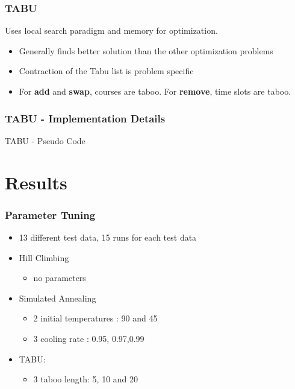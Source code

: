 \documentclass{beamer}
\makeatletter
\newenvironment{algorithm}[1][]{%
  \def\@captype{algorithm}%
  \par\nobreak\begin{center}\nobreak}
  {\par\nobreak\end{center}\nobreak}
\newcounter{algorithm}
\makeatother
\begin{document}
\begin{frame}
\frametitle{TABU}
Uses local search paradigm and memory for optimization.
\begin{itemize}
\item Generally finds better solution than the other optimization problems
\item Contraction of the Tabu list is problem specific
\item For \textbf{add} and \textbf{swap}, courses are taboo. For \textbf{remove}, time slots are taboo.
\end{itemize}
\end{frame}

\begin{frame}[shrink=20]
\frametitle{TABU  - Implementation Details}
\begin{algorithm}[H]
\begin{algorithmic}[1]
\REPEAT
{}
\ENDIF
{}
\ENDIF
{}
\end{algorithmic}
\caption{TABU - Pseudo Code}
\label{alg:seq}
\end{algorithm}
\end{frame}

\section{Results}

\begin{frame}
\frametitle{Parameter Tuning}
\begin{itemize}
\item 13 different test data, 15 runs for each test data

\item Hill Climbing
\begin{itemize}
	\item no parameters
\end{itemize}

\item Simulated Annealing 
\begin{itemize}
\item 2 initial temperatures : 90 and 45
\item 3 cooling rate : 0.95, 0.97,0.99
\end{itemize}
\item TABU: 
\begin{itemize}
\item 3 taboo length: 5, 10 and 20
\end{itemize}
\end{itemize}

\end{frame}
\end{document}

